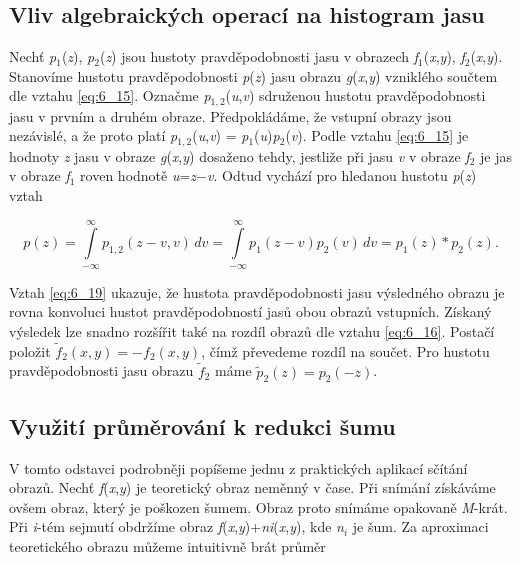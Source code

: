 \subsection*{Vliv algebraických operací na histogram jasu}

Nechť \textit{p}$_1$(\textit{z}), \textit{p}$_2$(\textit{z}) jsou hustoty pravděpodobnosti jasu v obrazech \textit{f}$_1$(\textit{x},\textit{y}), \textit{f}$_2$(\textit{x},\textit{y}). Stanovíme hustotu pravděpodobnosti \textit{p}(\textit{z}) jasu obrazu \textit{g}(\textit{x},\textit{y}) vzniklého součtem dle vztahu \eqref{eq:6_15}. Označme \textit{p}$_{1,2}$(\textit{u},\textit{v}) sdruženou hustotu pravděpodobnosti jasu v prvním a druhém obraze. Předpokládáme, že vstupní    obrazy jsou nezávislé, a že proto platí \textit{p}$_{1,2}$(\textit{u},\textit{v}) = \textit{p}$_1$(\textit{u})\textit{p}$_2$(\textit{v}). Podle vztahu \eqref{eq:6_15} je hodnoty \textit{z} jasu v obraze \textit{g}(\textit{x},\textit{y}) dosaženo tehdy, jestliže při jasu \textit{v} v obraze \textit{f}$_2$ je jas v obraze \textit{f}$_1$ roven hodnotě \textit{u}=\textit{z}$-$\textit{v}. Odtud vychází pro hledanou hustotu \textit{p}(\textit{z}) vztah 

\begin{equation} \label{eq:6_19}
    p(z) = \int\limits_{-\infty}^{\infty}p_{1,2}(z - v, v)\,dv = \int\limits_{-\infty}^{\infty}p_1(z-v)p_2(v)\,dv = p_1(z) \ast p_2(z).
\end{equation}

Vztah \eqref{eq:6_19} ukazuje, že hustota pravděpodobnosti jasu výsledného obrazu je rovna konvoluci hustot pravděpodobností jasů obou obrazů vstupních. Získaný výsledek lze snadno rozšířit také na rozdíl  obrazů dle vztahu \eqref{eq:6_16}. Postačí položit $\tilde{f}_2(x, y) = -f_2(x, y)$, čímž převedeme rozdíl na součet. Pro hustotu pravděpodobnosti jasu obrazu $\tilde{f}_2$ máme $\tilde{p}_2(z) = p_2(-z)$.

\subsection*{Využití průměrování k redukci šumu}

V tomto odstavci podrobněji popíšeme jednu z praktických aplikací sčítání obrazů. Nechť \textit{f}(\textit{x},\textit{y}) je teoretický obraz neměnný v čase. Při snímání získáváme ovšem obraz, který je poškozen šumem. Obraz proto snímáme opakovaně \textit{M}-krát. Při \textit{i}-tém sejmutí obdržíme obraz \textit{f}(\textit{x},\textit{y})+\textit{ni}(\textit{x},\textit{y}), kde \textit{n}$_i$ je šum. Za aproximaci teoretického obrazu můžeme intuitivně brát průměr

